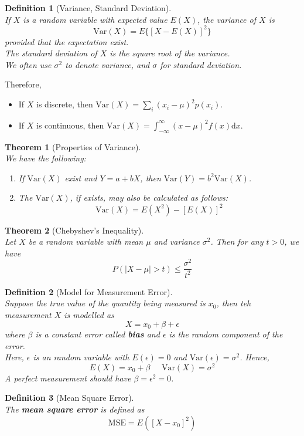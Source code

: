 \documentclass[12pt]{article}
\newcommand{\diff}{\mathrm{d}}
\newcommand{\var}{\mathrm{Var}}
\newtheorem{definition}{Definition}[section]
\newtheorem{theorem}{Theorem}[section]
\theoremstyle{definition}
\begin{document}
\begin{definition}[Variance, Standard Deviation]
\hfill\\\normalfont If $X$ is a random variable with expected value $E(X)$, the variance of $X$ is
\[
\var(X) = E\{[X-E(X)]^2\}
\]
provided that the expectation exist.\\
The standard deviation of $X$ is the square root of the variance.\\
We often use $\sigma^2$ to denote variance, and $\sigma$ for standard deviation.
\end{definition}
Therefore,
\begin{itemize}
  \item If $X$ is discrete, then $\var(X) = \sum_i (x_i-\mu)^2 p(x_i)$.
  \item If $X$ is continuous, then $\var(X) = \int_{-\infty}^\infty (x-\mu)^2 f(x)\diff x$.
\end{itemize}
\begin{theorem}[Properties of Variance]
\hfill\\\normalfont We have the following:
\begin{enumerate}
  \item If $\var(X)$ exist and $Y=a+bX$, then $\var(Y) = b^2\var(X)$.
  \item The $\var(X)$, if exists, may also be calculated as follows:
  \[
\var(X) = E(X^2)-[E(X)]^2
  \]
\end{enumerate}
\end{theorem}
\begin{theorem}[Chebyshev's Inequality]
\hfill\\\normalfont Let $X$ be a random variable with mean $\mu$ and variance $\sigma^2$. Then for any $t>0$, we have
\[
P(|X-\mu|>t)\leq \frac{\sigma^2}{t^2}
\]
\end{theorem}
\begin{definition}[Model for Measurement Error]
\hfill\\\normalfont Suppose the true value of the quantity being measured is $x_0$, then teh measurement $X$ is modelled as
\[
X=x_0+\beta+\epsilon
\]
where $\beta$ is a constant error called \textbf{bias} and $\epsilon$ is the random component of the error.\\
Here, $\epsilon$ is an random variable with $E(\epsilon)=0$ and $\var(\epsilon) = \sigma^2$. Hence, 
\[
E(X) = x_0+\beta\;\;\;\;\;\var(X)=\sigma^2
\]
A perfect measurement should have $\beta=\epsilon^2 = 0$.
\end{definition}
\begin{definition}[Mean Square Error]
\hfill\\\normalfont The \textbf{mean square error} is defined as
\[
\text{MSE} = E([X-x_0]^2)
\]
\end{definition}
\end{document}
